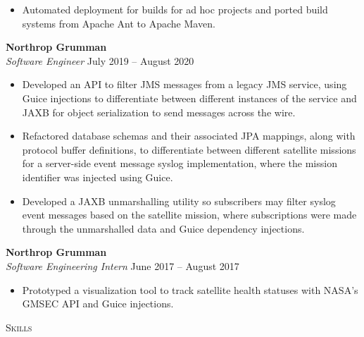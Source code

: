 \documentclass{res}
\begin{document}
\begin{resume}
\begin{itemize}
    \item Automated deployment for builds for ad hoc projects and ported build systems from Apache Ant to Apache Maven.
  \end{itemize}
\textbf{Northrop Grumman}\\
\textit{Software Engineer}
\hfill
July 2019 -- August 2020\\[1mm]
	\begin{itemize}
		\vspace{-3mm}
    \item Developed an API to filter JMS messages from a legacy JMS service, using Guice injections to differentiate between different instances of the service and JAXB for object serialization to send messages across the wire.
    \item Refactored database schemas and their associated JPA mappings, along with protocol buffer definitions, to differentiate between different satellite missions for a server-side event message syslog implementation, where the mission identifier was injected using Guice.
    \item Developed a JAXB unmarshalling utility so subscribers may filter syslog event messages based on the satellite mission, where subscriptions were made through the unmarshalled data and Guice dependency injections.
  \end{itemize}
\textbf{Northrop Grumman}\\
\textit{Software Engineering Intern}
\hfill
June 2017 -- August 2017\\[1mm]
	\begin{itemize}
		\vspace{-3mm}
\item Prototyped a visualization tool to track satellite health statuses with NASA's GMSEC API and Guice injections.
	\end{itemize}
\textsc{{\Large Skills}}
\vspace{0.5mm}

\end{resume}
\end{document}
